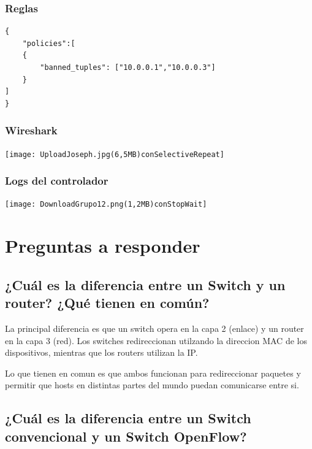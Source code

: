 \documentclass{article}
\begin{document}
\subsubsection{Reglas}

\begin{verbatim}
{
    "policies":[
    {
        "banned_tuples": ["10.0.0.1","10.0.0.3"]
    }
]
}
\end{verbatim}


\subsubsection{Wireshark}
\begin{center}
\texttt{[image: UploadJoseph.jpg(6,5MB)conSelectiveRepeat]}
\end{center}

\subsubsection{Logs del controlador}
\begin{center}
\texttt{[image: DownloadGrupo12.png(1,2MB)conStopWait]}
\end{center}

\newpage
\section{\texorpdfstring{\textbf{Preguntas a responder}}{Preguntas a responder}}\label{preguntas-a-responder}

\subsection{\texorpdfstring{\textbf{¿Cuál es la diferencia entre un Switch y un router? ¿Qué tienen en común?}}{1. ¿Cuál es la diferencia entre un Switch y un router? ¿Qué tienen en común?}}\label{describa-la-arquitectura-cliente-servidor.}

La principal diferencia es que un switch opera en la capa 2 (enlace) y un router en la capa 3 (red).
Los switches redireccionan utilzando la direccion MAC de los dispositivos, mientras que los
routers utilizan la IP.

Lo que tienen en comun es que ambos funcionan para redireccionar paquetes y permitir
que hosts en distintas partes del mundo puedan comunicarse entre si.

\subsection{\texorpdfstring{\textbf{¿Cuál es la diferencia entre un Switch convencional y un Switch OpenFlow?}}{¿Cuál es la diferencia entre un Switch convencional y un Switch OpenFlow?}}\label{detalle-el-protocolo-de-aplicaciuxf3n-desarrollado-en-este-trabajo.}
\end{document}
